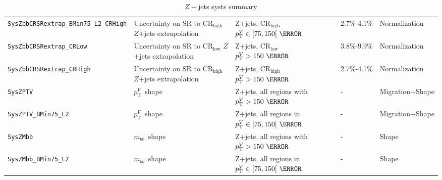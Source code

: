 \begin{table}
{\begin{tabular}{lllll}
      \texttt{SysZbbCRSRextrap\_BMin75\_L2\_CRHigh} & Uncertainty on SR to CR$_{\text{high}}$ $Z$+jets extrapolation & Z+jets, CR$_{\text{high}}$ $p_{\mathrm{T}}^V\in[75,150[~\GeV$ & 2.7\%-4.1\% & Normalization\\      
      \texttt{SysZbbCRSRextrap\_CRLow} & Uncertainty on SR to CR$_{\text{low}}$ $Z$+jets extrapolation & Z+jets, CR$_{\text{low}}$ $p_{\mathrm{T}}^V>150~\GeV$ & 3.8\%-9.9\% & Normalization\\
      \texttt{SysZbbCRSRextrap\_CRHigh} & Uncertainty on SR to CR$_{\text{high}}$ $Z$+jets extrapolation & Z+jets, CR$_{\text{high}}$ $p_{\mathrm{T}}^V>150~\GeV$ & 2.7\%-4.1\% & Normalization\\         
      \texttt{SysZPTV} & $p_{\mathrm{T}}^V$\ shape & Z+jets, all regions with $p_{\mathrm{T}}^V>150~\GeV$ & - & Migration+Shape \\
      \texttt{SysZPTV\_BMin75\_L2} & $p_{\mathrm{T}}^V$\ shape & Z+jets, all regions in $p_{\mathrm{T}}^V\in[75,150[~\GeV$ & - & Migration+Shape \\
      \texttt{SysZMbb} & $m_{bb}$\ shape & Z+jets, all regions with $p_{\mathrm{T}}^V>150~\GeV$ & - & Shape \\
      \texttt{SysZMbb\_BMin75\_L2} & $m_{bb}$\ shape & Z+jets, all regions in $p_{\mathrm{T}}^V\in[75,150[~\GeV$ & - & Shape \\
      \bottomrule
    \end{tabular}
  }
  \caption{$Z+$jets systs summary}
  \label{tab:Zjets_systematics}
\end{table}